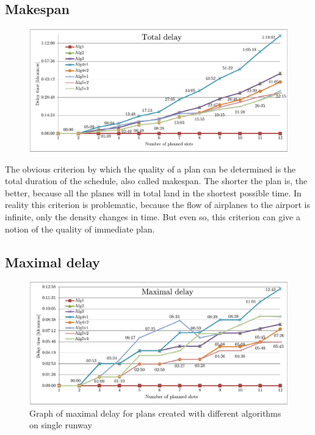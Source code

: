 \subsection{Makespan}

\begin{figure}[h]
    \centering
    \includegraphics[width=\textwidth]{graphs/1rwy-alternating-total-delay.pdf}
    \caption{}
    \label{graph:1rwy-alternating-makespan}
\end{figure}

The obvious criterion by which the quality of a plan can be determined is the total duration of the schedule, also called makespan. The shorter the plan is, the better, because all the planes will in total land in the shortest possible time. In reality this criterion is problematic, because the flow of airplanes to the airport is infinite, only the density changes in time. But even so, this criterion can give a notion of the quality of immediate plan.


\subsection{Maximal delay}

\begin{figure}[h]
    \centering
    \includegraphics[width=\textwidth]{graphs/1rwy-alternating-maximal-delay.pdf}
    \caption{Graph of maximal delay for plans created with different algorithms on single runway}
    \label{graph:1rwy-alternating-maximal-delay}
\end{figure}

